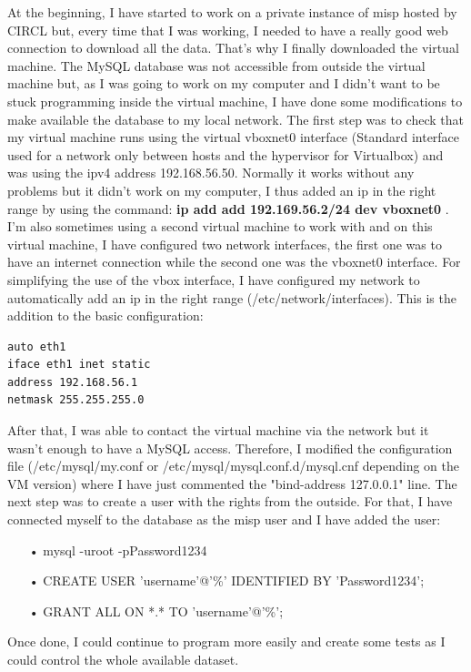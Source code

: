 \documentclass{eplmastersthesis}
\begin{document}
At the beginning, I have started to work on a private instance of \gls{misp} hosted by CIRCL but, every time that I was working, I needed to have a really good web connection to download all the data. That's why I finally downloaded the virtual machine. 
The MySQL database was not accessible from outside the virtual machine but, as I was going to work on my computer and I didn't want to be stuck programming inside the virtual machine, I have done some modifications to make available the database to my local network.
The first step was to check that my virtual machine runs using the virtual vboxnet0 interface (Standard interface used for a network only between hosts and the hypervisor for Virtualbox) and was using the \gls{ipv4} address 192.168.56.50. Normally it works without any problems but it didn't work on my computer, I thus added an \gls{ip} in the right range by using the command:
\textbf{ip add add 192.169.56.2/24 dev vboxnet0} .
I'm also sometimes using a second virtual machine to work with and on this virtual machine, I have configured two network interfaces, the first one was to have an internet connection while the second one was the vboxnet0 interface.
For simplifying the use of the vbox interface, I have configured my network to automatically add an \gls{ip} in the right range (/etc/network/interfaces). This is the addition to the basic configuration:
\begin{verbatim}
auto eth1
iface eth1 inet static
address 192.168.56.1
netmask 255.255.255.0
\end{verbatim}
 
After that, I was able to contact the virtual machine via the network but it wasn't enough to have a MySQL access.
Therefore, I modified the configuration file (/etc/mysql/my.conf or /etc/mysql/mysql.conf.d/mysql.cnf depending on the VM version) where I have just commented the "bind-address 127.0.0.1" line.
The next step was to create a user with the rights from the outside. For that, I have connected myself to the database as the \gls{misp} user and I have added the user:
\begin{itemize}
\item[•] mysql -uroot -pPassword1234 
\item[•] CREATE USER 'username'@'\%' IDENTIFIED BY 'Password1234';
\item[•] GRANT ALL ON *.* TO 'username'@'\%';
\end{itemize}

Once done, I could continue to program more easily and create some tests as I could control the whole available dataset.\\
\end{document}

